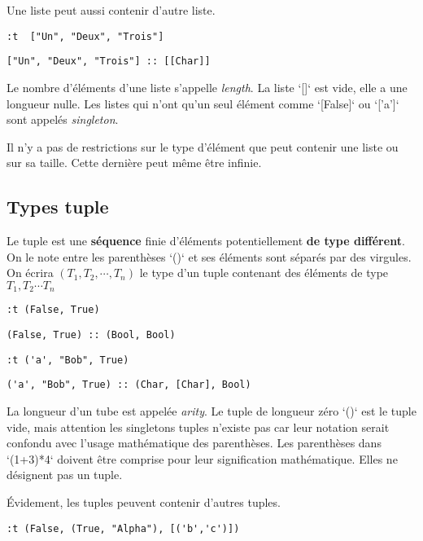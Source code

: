 \documentclass[11pt]{article}
\begin{document}
Une liste peut aussi contenir d'autre liste.
\begin{verbatim}
:t  ["Un", "Deux", "Trois"]
\end{verbatim}
\begin{verbatim}
["Un", "Deux", "Trois"] :: [[Char]]
\end{verbatim}


Le nombre d'éléments d'une liste s'appelle \emph{length}.  La liste `[]` est  vide, elle a une longueur nulle.   Les listes qui n'ont qu'un seul élément  comme `[False]` ou `['a']` sont appelés \emph{singleton}.

Il n'y a pas de restrictions sur le type d'élément que peut contenir une liste ou sur sa taille.   Cette dernière peut même être infinie.

\subsection{Types tuple}
\label{sec:orga01bd26}

Le tuple est une \textbf{séquence} finie d'éléments potentiellement \textbf{de type différent}.   On le note entre les parenthèses `()` et ses éléments sont séparés par des virgules.   On écrira \((T_1, T_2, \cdots{}, T_n)\)  le type d'un tuple contenant des éléments de type \(T_1, T_2 \cdots{} T_n\)

\begin{verbatim}
:t (False, True)
\end{verbatim}
\begin{verbatim}
(False, True) :: (Bool, Bool)
\end{verbatim}


\begin{verbatim}
:t ('a', "Bob", True)
\end{verbatim}
\begin{verbatim}
('a', "Bob", True) :: (Char, [Char], Bool)
\end{verbatim}


La longueur d'un tube est appelée \emph{arity}.   Le tuple de longueur zéro `()`  est le tuple vide, mais attention les singletons tuples n'existe pas car leur notation serait confondu avec l'usage mathématique des parenthèses.  Les parenthèses dans `(1+3)*4` doivent être comprise pour leur signification mathématique.  Elles ne désignent pas un tuple.


Évidement, les tuples peuvent contenir d'autres tuples.
\begin{verbatim}
:t (False, (True, "Alpha"), [('b','c')])
\end{verbatim}
\end{document}
